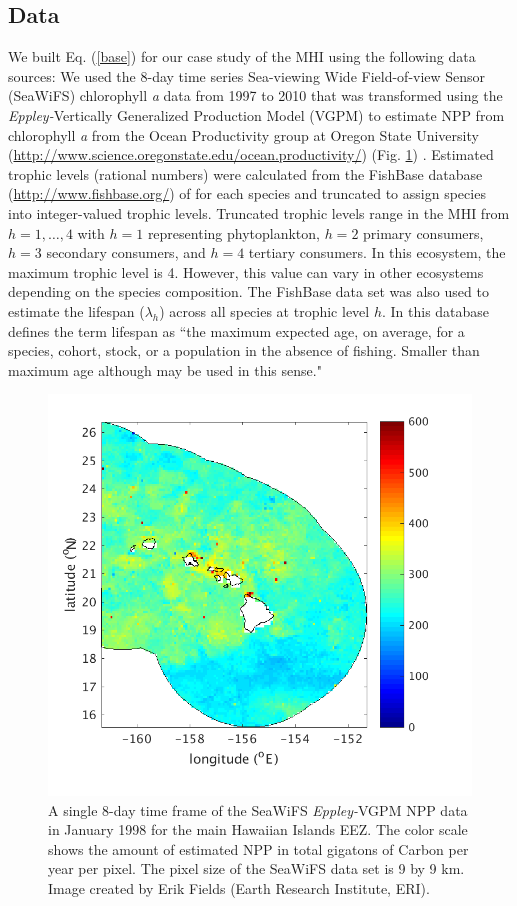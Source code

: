 \documentclass[oneside,12pt,final]{sty/ucthesis-CA2012}
\let\cite\citep                             %
\begin{document}
\begin{mainmatter}
\subsection{Data}
We built Eq. (\ref{base}) for our case study of the MHI using the following data sources: We used the 8-day time series Sea-viewing Wide Field-of-view Sensor (SeaWiFS) chlorophyll \textit{a} data from 1997 to 2010 that was transformed using the \textit{Eppley-}Vertically Generalized Production Model (VGPM) to estimate NPP from chlorophyll \textit{a} from the Ocean Productivity group at Oregon State University (\url{http://www.science.oregonstate.edu/ocean.productivity/}) (Fig. \ref{SeaWiFSmhi}) \cite{behrenfeld1997photosynthetic}. Estimated trophic levels (rational numbers) were calculated from the FishBase database (\url{http://www.fishbase.org/}) of \citet{fishbase} for each species and truncated to assign species into integer-valued trophic levels. Truncated trophic levels range in the MHI from $h=1,\dots,4$ with $h=1$ representing phytoplankton, $h=2$ primary consumers, $h=3$ secondary consumers, and $h=4$ tertiary consumers. In this ecosystem, the maximum trophic level is 4. However, this value can vary in other ecosystems depending on the species composition. The \citet{fishbase} FishBase data set was also used to estimate the lifespan ($\lambda_h$) across all species at trophic level $h$. In this database \citet{fishbase} defines the term lifespan as ``the maximum expected age, on average, for a species, cohort, stock, or a population in the absence of fishing. Smaller than maximum age although may be used in this sense."

\begin{figure}[H]
     \centering
       \includegraphics[width=.7\textwidth]{fig/SeaWiFSmhi}
    \caption{A single 8-day time frame of the SeaWiFS \textit{Eppley-}VGPM NPP data in January 1998 for the main Hawaiian Islands EEZ. The color scale shows the amount of estimated NPP in total gigatons of Carbon per year per pixel. The pixel size of the SeaWiFS data set is 9 by 9 km. Image created by Erik Fields (Earth Research Institute, ERI).}
    \label{SeaWiFSmhi}
\end{figure}


\end{mainmatter}
\end{document}
